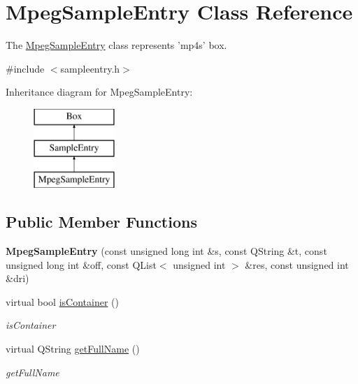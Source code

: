 \hypertarget{class_mpeg_sample_entry}{\section{Mpeg\-Sample\-Entry Class Reference}
\label{class_mpeg_sample_entry}
}


The \hyperlink{class_mpeg_sample_entry}{Mpeg\-Sample\-Entry} class represents 'mp4s' box.  




{\ttfamily \#include $<$sampleentry.\-h$>$}

Inheritance diagram for Mpeg\-Sample\-Entry\-:\begin{figure}[H]
\begin{center}
\leavevmode
\includegraphics[height=3.000000cm]{class_mpeg_sample_entry}
\end{center}
\end{figure}
\subsection*{Public Member Functions}
\begin{DoxyCompactItemize}
\item 
\hypertarget{class_mpeg_sample_entry_a4d437dcd0a69852716809b05bb610e32}{{\bfseries Mpeg\-Sample\-Entry} (const unsigned long int \&s, const Q\-String \&t, const unsigned long int \&off, const Q\-List$<$ unsigned int $>$ \&res, const unsigned int \&dri)}\label{class_mpeg_sample_entry_a4d437dcd0a69852716809b05bb610e32}

\item 
virtual bool \hyperlink{class_mpeg_sample_entry_a264a9e2915c1a17f5c7e4ff7f59dab47}{is\-Container} ()
\begin{DoxyCompactList}\small\item\em is\-Container \end{DoxyCompactList}\item 
virtual Q\-String \hyperlink{class_mpeg_sample_entry_ac07fbe3d0f06f9360acd2e60eb839928}{get\-Full\-Name} ()
\begin{DoxyCompactList}\small\item\em get\-Full\-Name \end{DoxyCompactList}\end{DoxyCompactItemize}
